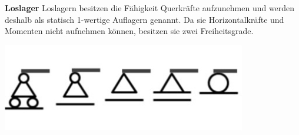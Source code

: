 \textbf{Loslager}
Loslagern besitzen die Fähigkeit Querkräfte aufzunehmen und werden deshalb als statisch 1-wertige Auflagern genannt.
Da sie Horizontalkräfte und Momenten nicht aufnehmen können, besitzen sie zwei Freiheitsgrade.
\begin{center}
	\includegraphics[width=0.8\textwidth]{papers/balken/images/teil1/Loslager.jpg}
\end{center}
\label{Festlagern werden typischerweise mit den folgenden Symbolen dargestellt.}

